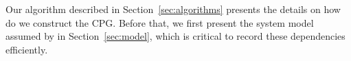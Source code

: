 %
% 
%
%


%
%




Our algorithm described in Section~\ref{sec:algorithms} presents the details on how do we construct the CPG. Before that,  we first present the system model assumed by \projecttitle in Section~\ref{sec:model}, which is critical to record these dependencies efficiently.














 